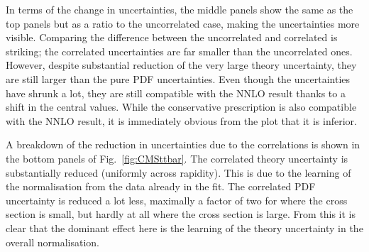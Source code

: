In terms of the change in uncertainties, the middle panels show the same as the top panels but as a ratio to the uncorrelated case, making the uncertainties more visible. Comparing the difference between the uncorrelated and correlated is striking; the correlated uncertainties are far smaller than the uncorrelated ones. However, despite substantial reduction of the very large theory uncertainty, they are still larger than the pure PDF uncertainties. Even though the uncertainties have shrunk a lot, they are still compatible with the NNLO result thanks to a shift in the central values. While the conservative prescription is also compatible with the NNLO result, it is immediately obvious from the plot that it is inferior. 

A breakdown of the reduction in uncertainties due to the correlations is shown in the bottom panels of Fig.~\ref{fig:CMSttbar}. The correlated theory uncertainty is substantially reduced (uniformly across rapidity). This is due to the learning of the normalisation from the data already in the fit. The correlated PDF uncertainty is reduced a lot less, maximally a factor of two for where the cross section is small, but hardly at all where the cross section is large. From this it is clear that the dominant effect here is the learning of the theory uncertainty in the overall normalisation.

